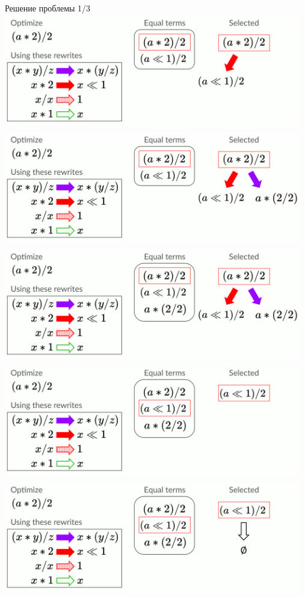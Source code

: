 \documentclass[aspectratio=169
  , xcolor={svgnames}
  , russian  %
  ]{beamer}
\begin{document}
\begin{frame}{Решение проблемы 1/3}
{   } 
    {
        \centering
        \includegraphics[width=13cm, height=5cm]{misc/egraphs_images/naive/n-3.jpg}
   } 
    {
        \centering
        \includegraphics[width=13cm, height=5cm]{misc/egraphs_images/naive/n-4.jpg}
   } 
    {
        \centering
        \includegraphics[width=13cm, height=5cm]{misc/egraphs_images/naive/n-5.jpg}
   } 
    {
        \centering
        \includegraphics[width=13cm, height=5cm]{misc/egraphs_images/naive/n-6.jpg}
   } 
    {
        \centering
        \includegraphics[width=13cm, height=5cm]{misc/egraphs_images/naive/n-7.jpg}
}
\end{frame}
\end{document}

